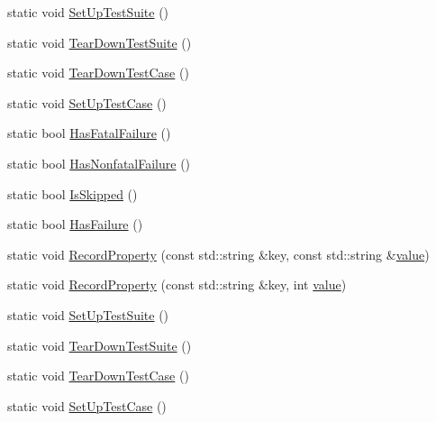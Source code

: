 \begin{DoxyCompactItemize}
\item 
static void \mbox{\hyperlink{classtesting_1_1_test_ae173b07a0fdd09fc1d417a2bb6cbdd76}{Set\+Up\+Test\+Suite}} ()
\item 
static void \mbox{\hyperlink{classtesting_1_1_test_a7704c8223ba28338a66ca2eaeba66383}{Tear\+Down\+Test\+Suite}} ()
\item 
static void \mbox{\hyperlink{classtesting_1_1_test_af374706cbaf0ffc460f4fd04e7c150f1}{Tear\+Down\+Test\+Case}} ()
\item 
static void \mbox{\hyperlink{classtesting_1_1_test_a5ccbac42fee8c5b00b0bfe89b6c49d79}{Set\+Up\+Test\+Case}} ()
\item 
static bool \mbox{\hyperlink{classtesting_1_1_test_a5e83604628ef542af888d631566ff60c}{Has\+Fatal\+Failure}} ()
\item 
static bool \mbox{\hyperlink{classtesting_1_1_test_a8c00e8cc6fe10616b480bd54d2a426cb}{Has\+Nonfatal\+Failure}} ()
\item 
static bool \mbox{\hyperlink{classtesting_1_1_test_a7f0ada5dbc9e772acb2b6cd0b1b300d7}{Is\+Skipped}} ()
\item 
static bool \mbox{\hyperlink{classtesting_1_1_test_a7a00be7dd0a6bfdc8d47a1b784623613}{Has\+Failure}} ()
\item 
static void \mbox{\hyperlink{classtesting_1_1_test_a1559ce1c83f56993b582650c091535a7}{Record\+Property}} (const std\+::string \&key, const std\+::string \&\mbox{\hyperlink{_obj__test_2lib_2googletest-master_2googlemock_2test_2gmock-matchers__test_8cc_a337b8a670efc0b086ad3af163f3121b6}{value}})
\item 
static void \mbox{\hyperlink{classtesting_1_1_test_a373da47b491b1e64e355d22d6ec99b5b}{Record\+Property}} (const std\+::string \&key, int \mbox{\hyperlink{_obj__test_2lib_2googletest-master_2googlemock_2test_2gmock-matchers__test_8cc_a337b8a670efc0b086ad3af163f3121b6}{value}})
\item 
static void \mbox{\hyperlink{classtesting_1_1_test_ae173b07a0fdd09fc1d417a2bb6cbdd76}{Set\+Up\+Test\+Suite}} ()
\item 
static void \mbox{\hyperlink{classtesting_1_1_test_a7704c8223ba28338a66ca2eaeba66383}{Tear\+Down\+Test\+Suite}} ()
\item 
static void \mbox{\hyperlink{classtesting_1_1_test_af374706cbaf0ffc460f4fd04e7c150f1}{Tear\+Down\+Test\+Case}} ()
\item 
static void \mbox{\hyperlink{classtesting_1_1_test_a5ccbac42fee8c5b00b0bfe89b6c49d79}{Set\+Up\+Test\+Case}} ()

\end{DoxyCompactItemize}
